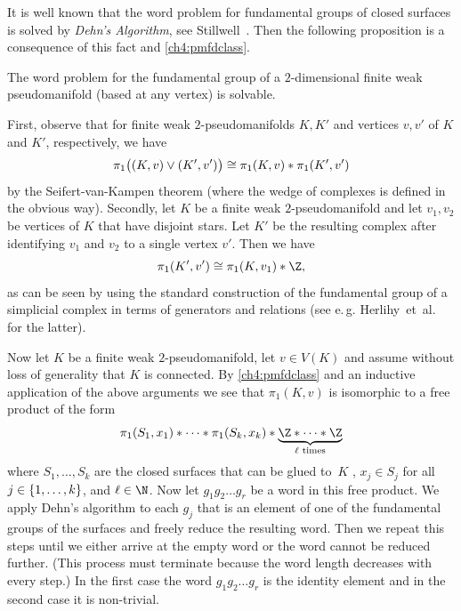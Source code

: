 It is well known that the word problem for fundamental groups of closed surfaces
is solved by \emph{Dehn's Algorithm}, see
Stillwell~\cite[Sec.~6.1]{bookc:stillwell93}.
Then the following proposition is a consequence of this fact and
\cref{ch4:pmfdclass}.

\begin{thProposition}
    \label{ch4:wordproblem}
    The word problem for the fundamental group of a $2$-dimensional finite weak
    pseudo\-manifold (based at any vertex) is solvable.
\end{thProposition}

\begin{proofsketch}
    First, observe that for finite weak $2$-pseudomanifolds $K,K'$ and vertices
    $v,v'$ of $K$ and $K'$, respectively, we have 
    \[  \pi_1\bigl( (K,v) \vee (K',v') \bigr)
            \cong \pi_1(K,v) \ast \pi_1(K',v')
    \]
    by the Seifert-van-Kampen theorem (where the wedge of complexes is defined
    in the obvious way). Secondly, let $K$ be a finite weak $2$-pseudomanifold
    and let $v_1,v_2$ be vertices of $K$ that have disjoint stars.
    Let $K'$ be the resulting complex after identifying $v_1$ and $v_2$ to a
    single vertex $v'$. Then we have
    \[ \pi_1(K',v') \cong \pi_1(K,v_1) \ast \Z , \]
    as can be seen by using the standard construction of the fundamental group
    of a simplicial complex in terms of generators and relations (see e.\,g.
    Herlihy~et~al.~\cite[Subsec.~15.1.2]{bookc:herlihyetal13}
    for the latter).

    Now let $K$ be a finite weak $2$-pseudomanifold, let $v\in V(K)$
    and assume without loss of generality that $K$ is connected.
    By \cref{ch4:pmfdclass} and an inductive application of the above arguments
    we see that $\pi_1(K,v)$ is isomorphic to a free product of the form
    \[ \pi_1(S_1,x_1) \ast \cdots \ast \pi_1(S_k,x_k)
        \ast \underbrace{\Z \ast \cdots \ast \Z}_{\ell\text{ times}}
    \]
    where $S_1,\dots,S_k$ are the closed surfaces that can be glued to~$K$
    , $x_j\in S_j$ for all $j\in\{1,\ldots,k\}$, and
    $\ell\in\N$. Now let $g_1g_2\dots g_r$ be a word in this free product.
    We apply Dehn's algorithm to each $g_j$ that is an
    element of one of the fundamental groups of the surfaces and
    freely reduce the resulting word. Then we repeat this steps until we
    either arrive at the empty word or the word cannot be reduced further.
    (This process must terminate because the word length decreases with every
    step.) In the first case the word $g_1g_2\dots g_r$ is the identity element
    and in the second case it is non-trivial.
    \\
\end{proofsketch}

